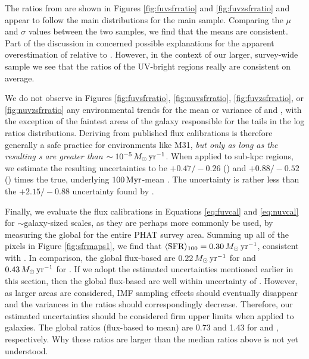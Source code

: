\documentclass[iop, tighten]{emulateapj}
\begin{document}
The \fuv{} \sfr{} ratios from \citet{Simones:2014} are shown in Figures
\ref{fig:fuvsfrratio} and \ref{fig:fuvzsfrratio} and appear to follow the main
distributions for the main sample. Comparing the $\mu$ and $\sigma$ values
between the two samples, we find that the means are consistent. Part of the
discussion in \citet{Simones:2014} concerned possible explanations for the
apparent overestimation of  relative to \sfroneh{}. However, in the
context of our larger, survey-wide sample we see that the \sfr{} ratios of the
UV-bright regions really are consistent on average.

We do not observe in Figures \ref{fig:fuvsfrratio}, \ref{fig:nuvsfrratio},
\ref{fig:fuvzsfrratio}, or \ref{fig:nuvzsfrratio} any environmental trends for
the mean or variance of \sfrx{} and \sfrxz{}, with the exception of the
faintest areas of the galaxy responsible for the tails in the log \sfr{} ratios
distributions. Deriving  from published flux calibrations is therefore
generally a safe practice for environments like M31, \emph{but only as long as
the resulting \sfr{}s are greater than $\sim 10^{-5}\,M_\odot\,\mathrm{yr}^{-1}$}. When
applied to sub-kpc regions, we estimate the resulting uncertainties to be
$+\!0.47/\!-\!0.26$ (\fuv{}) and $+\!0.88/\!-\!0.52$ (\nuv{}) times the true,
underlying $100\,\mathrm{Myr}$-mean \sfr{}. The \sfrfuv{} uncertainty is rather less than
the $+\!2.15/\!-\!0.88$ uncertainty found by \citet{Simones:2014}.

Finally, we evaluate the flux calibrations in Equations \ref{eq:fuvcal} and
\ref{eq:nuvcal} for $\sim$galaxy-sized scales, as they are perhaps more
commonly be used, by measuring the global \sfr{} for the entire PHAT survey
area. Summing up all of the pixels in Figure \ref{fig:sfrmaps1}, we find that
$\langle\mathrm{SFR}\rangle_{100}=0.30\,M_\odot\,\mathrm{yr}^{-1}$, consistent with \citet{Lewis:2014}. In
comparison, the global flux-based  are $0.22\,M_\odot\,\mathrm{yr}^{-1}$ for \fuv{}
and $0.43\,M_\odot\,\mathrm{yr}^{-1}$ for \nuv{}. If we adopt the estimated uncertainties
mentioned earlier in this section, then the global flux-based  are well
within uncertainty of \sfroneh{}. However, as larger areas are considered, IMF
sampling effects should eventually disappear and the variances in the \sfr{}
ratios should correspondingly decrease. Therefore, our estimated uncertainties
should be considered firm upper limits when applied to galaxies. The global
\sfr{} ratios (flux-based to mean) are 0.73 and 1.43 for \fuv{} and \nuv{},
respectively. Why these ratios are larger than the median ratios above is not
yet understood.
\end{document}
